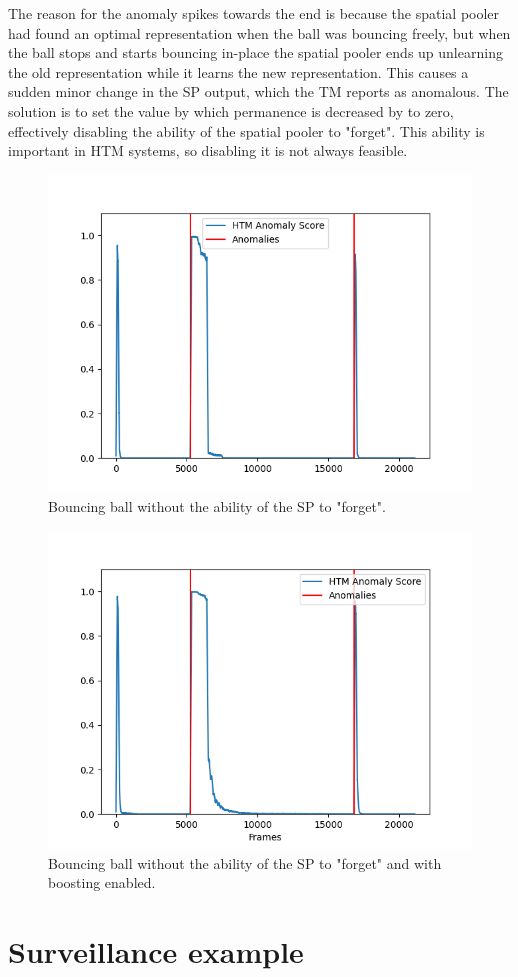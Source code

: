 The reason for the anomaly spikes towards the end is because the spatial pooler had found an optimal representation when the ball was bouncing freely, but when the ball stops and starts bouncing in-place the spatial pooler ends up unlearning the old representation while it learns the new representation. This causes a sudden minor change in the SP output, which the TM reports as anomalous. The solution is to set the value by which permanence is decreased by to zero, effectively disabling the ability of the spatial pooler to "forget". This ability is important in HTM systems, so disabling it is not always feasible.
\begin{figure}[H]
    \centering
    \includegraphics[width=\textwidth]{resources/experiments/bouncing_ball/bb_anoms_unforgetting.png}
    \caption{Bouncing ball without the ability of the SP to "forget".}
\end{figure}
\begin{figure}[H]
    \centering
    \includegraphics[width=\textwidth]{resources/experiments/bouncing_ball/bb_anoms_unforgetting_boosting.png}
    \caption{Bouncing ball without the ability of the SP to "forget" and with boosting enabled.}
\end{figure}
\section{Surveillance example}